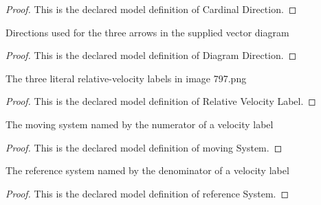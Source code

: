 \begin{proof}
  This is the declared model definition of Cardinal Direction.
\end{proof}
\begin{definition}
  \label{def:physics:phyx-mini-0797:phyxminiproblems-problemphyxmini0797-diagramdirection}
  Directions used for the three arrows in the supplied vector diagram
\end{definition}
\begin{proof}
  This is the declared model definition of Diagram Direction.
\end{proof}
\begin{definition}
  \label{def:physics:phyx-mini-0797:phyxminiproblems-problemphyxmini0797-relativevelocitylabel}
  The three literal relative-velocity labels in image 797.png
\end{definition}
\begin{proof}
  This is the declared model definition of Relative Velocity Label.
\end{proof}
\begin{definition}
  \label{def:physics:phyx-mini-0797:phyxminiproblems-problemphyxmini0797-movingsystem}
  The moving system named by the numerator of a velocity label
\end{definition}
\begin{proof}
  This is the declared model definition of moving System.
\end{proof}
\begin{definition}
  \label{def:physics:phyx-mini-0797:phyxminiproblems-problemphyxmini0797-referencesystem}
  The reference system named by the denominator of a velocity label
\end{definition}
\begin{proof}
  This is the declared model definition of reference System.
\end{proof}
